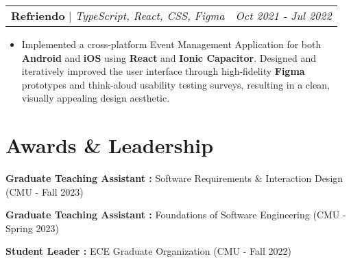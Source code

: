 \documentclass[letterpaper]{article}
\makeatletter
\newcommand{\resumeItemWithoutTitle}[1]{
  \item\small{
    {#1 \vspace{-2pt}}
  }
}
\newcommand{\shortSection}[1]{
    \vspace{-6pt}
    \section{#1}
}
\newcommand{\projectHeading}[3]{
  \begin{tabular*}{\textwidth}{l@{\extracolsep{\fill}}r}
        \textbf{#1} 
        \hspace{-2pt} $\vert$ \hspace{-2pt} \small{\textit{#2}} 
        & 
        \textit{#3} \\
    \end{tabular*}\vspace{-2pt}
}
\newcommand*{\skill}[2]{
  \textbf{#1 : }#2 \\
  \vspace{1pt}
}
\newcommand{\resumeItemListStart}{\begin{itemize}}
\newcommand{\resumeItemListEnd}{\end{itemize}}
\makeatother
\begin{document}
\vspace{3pt}
\projectHeading {Refriendo}{TypeScript, React, CSS, Figma}{Oct 2021 - Jul 2022}
\resumeItemListStart
\resumeItemWithoutTitle{Implemented a cross-platform Event Management Application for both \textbf{Android} and \textbf{iOS} using \textbf{React} and \textbf{Ionic Capacitor}. Designed and iteratively improved the user interface through high-fidelity \textbf{Figma} prototypes and think-aloud usability testing surveys, resulting in a clean, visually appealing design aesthetic.}
\resumeItemListEnd

\shortSection{Awards \& Leadership}
\skill{Graduate Teaching Assistant}{Software Requirements \& Interaction Design (CMU - Fall 2023)}
\skill{Graduate Teaching Assistant}{Foundations of Software Engineering (CMU - Spring 2023)}
\skill{Student Leader}{ECE Graduate Organization (CMU - Fall 2022)}
\end{document}
